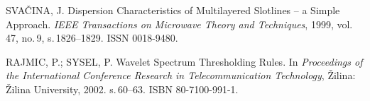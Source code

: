 \begin{thebibliography}{99}
	SVAČINA, J.
	Dispersion Characteristics of Multilayered Slotlines -- a Simple Approach.
	\emph{IEEE Transactions on Microwave Theory and Techniques},
	1999, vol.\,47, no.\,9, s.\,1826--1829. ISSN 0018-9480.

    RAJMIC, P.; SYSEL, P.
    Wavelet Spectrum Thresholding Rules.
    In \emph{Proceedings of the International Conference Research in Telecommunication Technology},
    Žilina: Žilina University, 2002. s.\,60--63. ISBN 80-7100-991-1.

\end{thebibliography}


%
%
%
